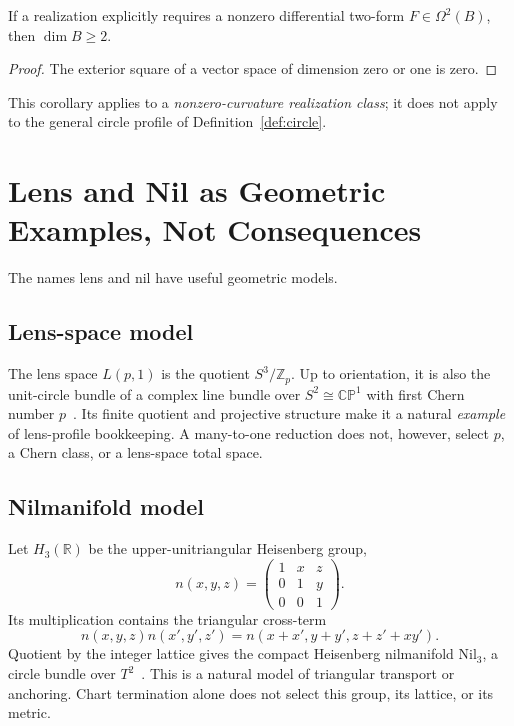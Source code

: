 \documentclass[11pt]{article}
\begin{document}
\begin{corollary}
If a realization explicitly requires a nonzero differential two-form
$F\in\Omega^2(B)$, then $\dim B\geq2$.
\end{corollary}

\begin{proof}
The exterior square of a vector space of dimension zero or one is zero.
\end{proof}

This corollary applies to a \emph{nonzero-curvature realization class}; it does
not apply to the general circle profile of Definition~\ref{def:circle}.

\section{Lens and Nil as Geometric Examples, Not Consequences}

The names lens and nil have useful geometric models.

\subsection{Lens-space model}

The lens space $L(p,1)$ is the quotient $S^3/\mathbb Z_p$.  Up to orientation,
it is also the unit-circle bundle of a complex line bundle over
$S^2\cong\mathbb{CP}^1$ with first Chern number $p$~\cite{BoothbyWang}.
Its finite quotient and
projective structure make it a natural \emph{example} of lens-profile
bookkeeping.  A many-to-one reduction does not, however, select $p$, a Chern
class, or a lens-space total space.

\subsection{Nilmanifold model}

Let $H_3(\mathbb R)$ be the upper-unitriangular Heisenberg group,
\[
n(x,y,z)=
\begin{pmatrix}
1&x&z\\
0&1&y\\
0&0&1
\end{pmatrix}.
\]
Its multiplication contains the triangular cross-term
\[
n(x,y,z)n(x',y',z')
=
n(x+x',y+y',z+z'+xy').
\]
Quotient by the integer lattice gives the compact Heisenberg nilmanifold
$\mathrm{Nil}_3$, a circle bundle over $T^2$~\cite{Thurston}.  This is a
natural model of
triangular transport or anchoring.  Chart termination alone does not select
this group, its lattice, or its metric.
\end{document}
